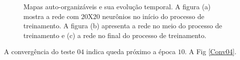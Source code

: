 \begin{figure}[H]
	\centering
	\qquad
	\qquad
	\qquad
	\caption{Mapas auto-organizáveis e sua evolução temporal. A figura (a) mostra a rede com $20$X$20$ neurônios no início do processo de treinamento. A figura (b) apresenta a rede no meio do processo de treinamento e (c) a rede no final do processo de treinamento.}
	\label{SOMt04}
\end{figure}

A convergência do teste $04$ indica queda próximo a época $10$. A Fig \ref{Conv04}. 

